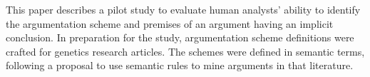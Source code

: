 This paper describes a pilot study to evaluate human analysts' ability to identify the argumentation scheme and premises of an argument having an implicit conclusion.  In preparation for the study, argumentation scheme definitions were crafted for genetics research articles.  The schemes were defined in semantic terms, following a proposal to use semantic rules to mine arguments in that literature.

